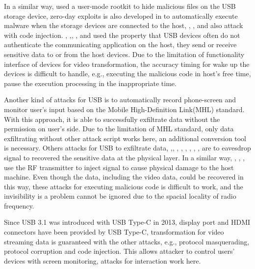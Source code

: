 In a similar way, \cite{duqu} used a user-mode rootkit to hide malicious files on the USB storage device, zero-day exploits is also developed in \cite{zero-day} to automatically execute malware when the storage devices are connected to the host, \cite{brain}, \cite{stuxnet}, \cite{conficker} and \cite{flame} also attack with code injection. \cite{webcam}, \cite{malware},\cite{audioextraction}, \cite{usbee}, and \cite{turnip} used the property that USB devices often do not authenticate the communicating application on the host, they send or receive sensitive data to or from the host devices. Due to the limitation of functionality interface of devices for video transformation, the accuracy timing for wake up the devices is difficult to handle, e.g., executing the malicious code in host's free time, pause the execution processing in the inappropriate time. 

Another kind of attacks for USB \cite{JFC} is to automatically record phone-screen and monitor user's input based on  the Mobile High-Definition Link(MHL) standard. With this approach, it is able to successfully exfiltrate data without the permission on user's side. Due to the limitation of MHL standard, only data exfiltrating without other attack script works here, an additional conversion tool is necessary. Others attacks for USB to exfiltrate data\cite{smartphone}, \cite{poweremi},\cite{revealing}, \cite{su2017usb}, \cite{usbgpslocator}, \cite{bates2014leveraging}, \cite{badusbhub}, \cite{usbfinger}, \cite{side}, \cite{usbdriver} are to eavesdrop signal to recovered the sensitive data at the physical layer. In a similar way, \cite{usbkiller}, \cite{cable}, \cite{usbee}, \cite{turnip} use the RF transmitter to inject signal to cause physical damage to the host machine. Even though the data, including the video data, could be recovered in this way, these attacks for executing malicious code is difficult to work, and the invisibility is a problem cannot be ignored due to the spacial locality of radio frequency. 


Since USB 3.1 was introduced with USB Type-C in 2013, display port and HDMI connectors have been provided by USB Type-C, transformation for video streaming data is guaranteed with the other attacks, e.g., protocol masquerading,  protocol corruption and code injection. This allows attacker to control users' devices with screen monitoring, attacks for interaction work here.



\\


